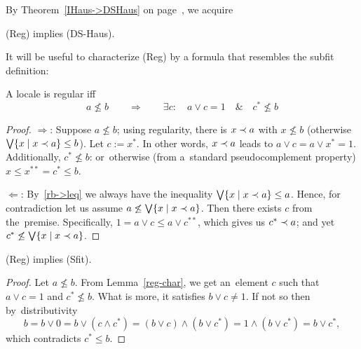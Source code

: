 By Theorem~\ref{IHaus->DSHaus} on page~\pageref{IHaus->DSHaus}\thinspace, we
acquire
\begin{cor}
  (Reg) implies (DS-Haus).
\end{cor}

It will be useful to characterize (Reg) by a formula that resembles the subfit
definition:
\begin{lem} \label{reg-char}
  A locale is regular iff
  \[
    a \not\le b \qquad \Rightarrow \qquad \exists c: \quad a \vee c = 1 \quad
    \& \quad c^* \not\leq b
  \]
\end{lem}
\begin{proof}
  $\Rightarrow$:
  Suppose $a \not\le b$;
  using regularity, there is $x \prec a$ with $x \not\le b$ (otherwise $\bigvee
  \{x \mid x \prec a\} \le b$).
  Let $c := x^*$.
  In other words, $x \prec a$ leads to $a \vee c = a \vee x^* = 1$.
  Additionally, $c^* \not\le b$:
  or~otherwise (from a~standard pseudocomplement property) $x \le x^{**} = c^*
  \le b$.

  $\Leftarrow$:
  By~\ref{rb->leq} we always have the inequality $\bigvee \{x \mid x \prec a\} \le
  a$.
  Hence, for contradiction let us assume $a \not\le \bigvee \{x \mid x \prec a\}$.
  Then there exists $c$ from the~premise.
  Specifically, $1 = a \vee c \le a \vee c^{**}$, which gives us $c^* \prec a$;
  and yet $c^* \not\le \bigvee \{x \mid x \prec a\}$.
\end{proof}

\begin{thm}
  (Reg) implies (Sfit).
\end{thm}
\begin{proof}
  Let $a \not\le b$.
  From Lemma~\ref{reg-char}\thinspace, we get an~element $c$ such that $a \vee
  c = 1$ and $c^* \not\le b$.
  What is more, it satisfies $b \vee c \ne 1$.
  If not so then by~distributivity
  \[
    b = b \vee 0 = b \vee (c \wedge c^*) = (b \vee c) \wedge (b \vee c^*) = 1
    \wedge (b \vee c^*) = b \vee c^*,
  \]
  which contradicts $c^*
  \le b$.
\end{proof}
